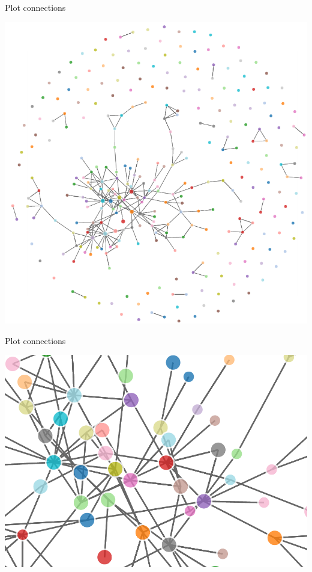 \documentclass[ignorenonframetext,]{beamer}
\begin{document}
\begin{frame}{Plot connections}

\includegraphics{fig/network2.png}

\end{frame}

\begin{frame}{Plot connections}

\includegraphics{fig/network3.png}

\end{frame}
\end{document}
